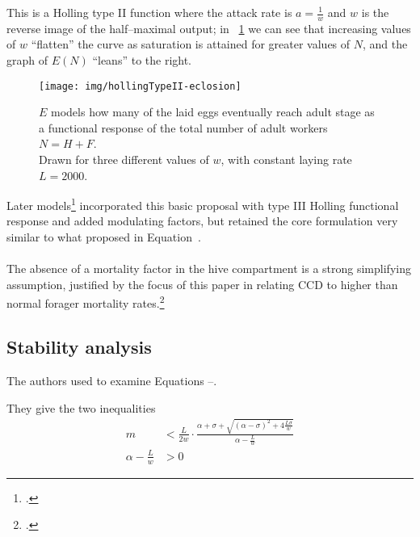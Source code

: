 This is a Holling type II function where the attack rate is $a=\frac{1}{w}$ and $w$ is the reverse image of the half--maximal output; in \figurename~\ref{img:eclos} we can see that increasing values of $w$ ``flatten'' the curve
as saturation is attained for greater values of $N$, and the graph of $E(N)$ ``leans'' to the right.

\begin{figure}[pbh]
    \centering
    \texttt{[image: img/hollingTypeII-eclosion]}

    \caption[Holling type II Eclosion]{$E$ models how many of the laid eggs eventually reach adult stage as a functional response of the total number of adult workers $N=H+F$.
    \\
    Drawn for three different values of $w$, with constant laying rate $L=2000$.}
    \label{img:eclos}
\end{figure}

Later models\footcite{ratti2017} incorporated this basic proposal with type III Holling functional response and added modulating factors, but retained the core formulation very similar to what     \citeauthor{khoury2011} proposed in Equation~.

\paragraph{}
The absence of a mortality factor in the hive compartment  is a strong simplifying assumption,
justified by the focus of this paper in relating CCD to higher than normal forager mortality rates.\footcite[1,2,3,5]{khoury2011}

\subsection{Stability analysis}
The authors used  to examine Equations --.

They give the two inequalities
\begin{align}
    m &< \frac{L}{2w} \cdot \frac{\alpha + \sigma + \sqrt{{(\alpha - \sigma)}^2
            + 4 \frac{L \sigma}{w} } }{\alpha - \frac{L}{w}}
    \label{eq:posEq1} \\
    \alpha - \frac{L}{w} &> 0 \label{eq:posEq2} %
\end{align}


